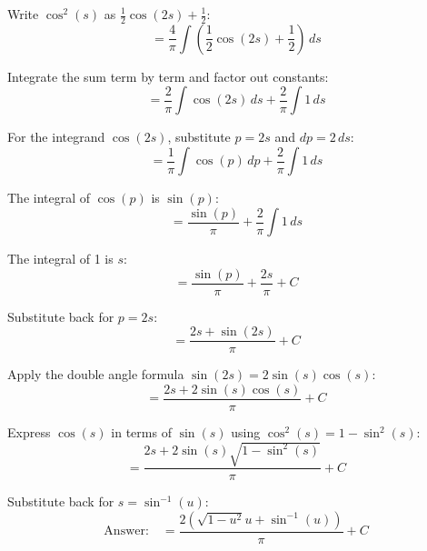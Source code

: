 \singlespacing
Write \(\cos^2(s)\) as \(\frac{1}{2} \cos(2 s) + \frac{1}{2}\):
\singlespacing
\begin{equation}
    = \frac{4}{\pi} \int \left( \frac{1}{2} \cos(2 s) + \frac{1}{2} \right) \, ds
\end{equation}

\singlespacing
Integrate the sum term by term and factor out constants:
\singlespacing
\begin{equation}
    = \frac{2}{\pi} \int \cos(2 s) \, ds + \frac{2}{\pi} \int 1 \, ds
\end{equation}

\singlespacing
For the integrand \(\cos(2 s)\), substitute \(p = 2 s\) and \(dp = 2 \, ds\):
\singlespacing
\begin{equation}
    = \frac{1}{\pi} \int \cos(p) \, dp + \frac{2}{\pi} \int 1 \, ds
\end{equation}

\singlespacing
The integral of \(\cos(p)\) is \(\sin(p)\):
\singlespacing
\begin{equation}
    = \frac{\sin(p)}{\pi} + \frac{2}{\pi} \int 1 \, ds
\end{equation}

\singlespacing
The integral of 1 is \(s\):
\singlespacing
\begin{equation}
    = \frac{\sin(p)}{\pi} + \frac{2 s}{\pi} + C
\end{equation}

\singlespacing
Substitute back for \(p = 2 s\):
\singlespacing
\begin{equation}
    = \frac{2 s + \sin(2 s)}{\pi} + C
\end{equation}

\singlespacing
Apply the double angle formula \(\sin(2 s) = 2 \sin(s) \cos(s)\):
\singlespacing
\begin{equation}
    = \frac{2 s + 2 \sin(s) \cos(s)}{\pi} + C
\end{equation}

\singlespacing
Express \(\cos(s)\) in terms of \(\sin(s)\) using \(\cos^2(s) = 1 - \sin^2(s)\):
\singlespacing
\begin{equation}
    = \frac{2 s + 2 \sin(s) \sqrt{1 - \sin^2(s)}}{\pi} + C
\end{equation}

\singlespacing
Substitute back for \(s = \sin^{-1}(u)\):
\singlespacing
\begin{equation}
    \text{Answer:} \quad = \frac{2 (\sqrt{1 - u^2} u + \sin^{-1}(u))}{\pi} + C
\end{equation}